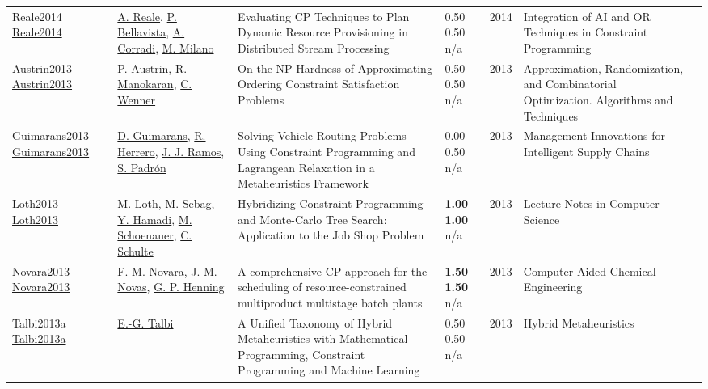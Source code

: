 {\begin{longtable}{p{3cm}p{5cm}p{10cm}p{1cm}rp{2.5cm}l}
Reale2014 \href{http://dx.doi.org/10.1007/978-3-319-07046-9_14}{Reale2014} & \hyperref[auth:a1693]{A. Reale}, \hyperref[auth:a1694]{P. Bellavista}, \hyperref[auth:a1695]{A. Corradi}, \hyperref[auth:a143]{M. Milano} & Evaluating CP Techniques to Plan Dynamic Resource Provisioning in Distributed Stream Processing & \noindent{}0.50 0.50 n/a & 2014 & Integration of AI and OR Techniques in Constraint Programming & \cite{Reale2014}\\
Austrin2013 \href{http://dx.doi.org/10.1007/978-3-642-40328-6_3}{Austrin2013} & \hyperref[auth:a1929]{P. Austrin}, \hyperref[auth:a1930]{R. Manokaran}, \hyperref[auth:a1931]{C. Wenner} & \cellcolor{green!10}On the NP-Hardness of Approximating Ordering Constraint Satisfaction Problems & \noindent{}0.50 0.50 n/a & 2013 & Approximation, Randomization, and Combinatorial Optimization. Algorithms and Techniques & \cite{Austrin2013}\\
Guimarans2013 \href{http://dx.doi.org/10.4018/978-1-4666-2461-0.ch007}{Guimarans2013} & \hyperref[auth:a1840]{D. Guimarans}, \hyperref[auth:a1841]{R. Herrero}, \hyperref[auth:a1842]{J. J. Ramos}, \hyperref[auth:a1843]{S. Padrón} & Solving Vehicle Routing Problems Using Constraint Programming and Lagrangean Relaxation in a Metaheuristics Framework & \noindent{}\textcolor{black!50}{0.00} 0.50 n/a & 2013 & Management Innovations for Intelligent Supply Chains & \cite{Guimarans2013}\\
Loth2013 \href{http://dx.doi.org/10.1007/978-3-642-44973-4_35}{Loth2013} & \hyperref[auth:a2047]{M. Loth}, \hyperref[auth:a2048]{M. Sebag}, \hyperref[auth:a2049]{Y. Hamadi}, \hyperref[auth:a2050]{M. Schoenauer}, \hyperref[auth:a92]{C. Schulte} & \cellcolor{green!10}Hybridizing Constraint Programming and Monte-Carlo Tree Search: Application to the Job Shop Problem & \noindent{}\textbf{1.00} \textbf{1.00} n/a & 2013 & Lecture Notes in Computer Science & \cite{Loth2013}\\
Novara2013 \href{http://dx.doi.org/10.1016/b978-0-444-63234-0.50099-3}{Novara2013} & \hyperref[auth:a587]{F. M. Novara}, \hyperref[auth:a524]{J. M. Novas}, \hyperref[auth:a588]{G. P. Henning} & A comprehensive CP approach for the scheduling of resource-constrained multiproduct multistage batch plants & \noindent{}\textbf{1.50} \textbf{1.50} n/a & 2013 & Computer Aided Chemical Engineering & \cite{Novara2013}\\
Talbi2013a \href{http://dx.doi.org/10.1007/978-3-642-30671-6_1}{Talbi2013a} & \hyperref[auth:a1659]{E.-G. Talbi} & A Unified Taxonomy of Hybrid Metaheuristics with Mathematical Programming, Constraint Programming and Machine Learning & \noindent{}0.50 0.50 n/a & 2013 & Hybrid Metaheuristics & \cite{Talbi2013a}\\

\end{longtable}}
